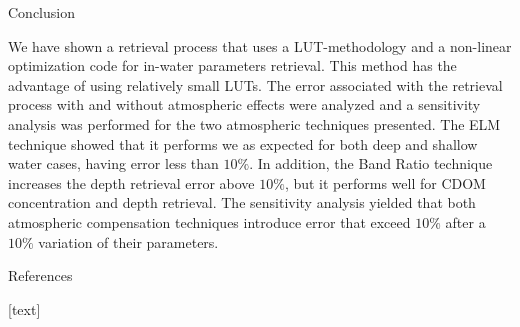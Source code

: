 \documentclass[mathserif]{beamer}
\begin{document}
\begin{frame}{}
\begin{columns}[t]
\begin{column}{.3\linewidth}
\begin{block}{Conclusion}
	
\justifying\small We have shown a retrieval process that uses a LUT-methodology and a non-linear optimization code for in-water parameters retrieval. This method has the advantage of using relatively small LUTs. The error associated with the retrieval process with and without atmospheric effects were analyzed and a sensitivity analysis was performed for the two atmospheric techniques presented. The ELM technique showed that it performs we as expected for both deep and shallow water cases, having error less than $10\%$. In addition, the Band Ratio technique increases the depth retrieval error above $10\%$, but it performs well for CDOM concentration and depth retrieval. The sensitivity analysis yielded that both atmospheric compensation techniques introduce error that exceed $10\%$ after a $10\%$ variation of their parameters.
\end{block}


\begin{block}{References} 
   
 { \scriptsize 
{}[text]
				
				
}
\end{block} 

\end{column}
\end{columns}
\end{frame}
\end{document}

